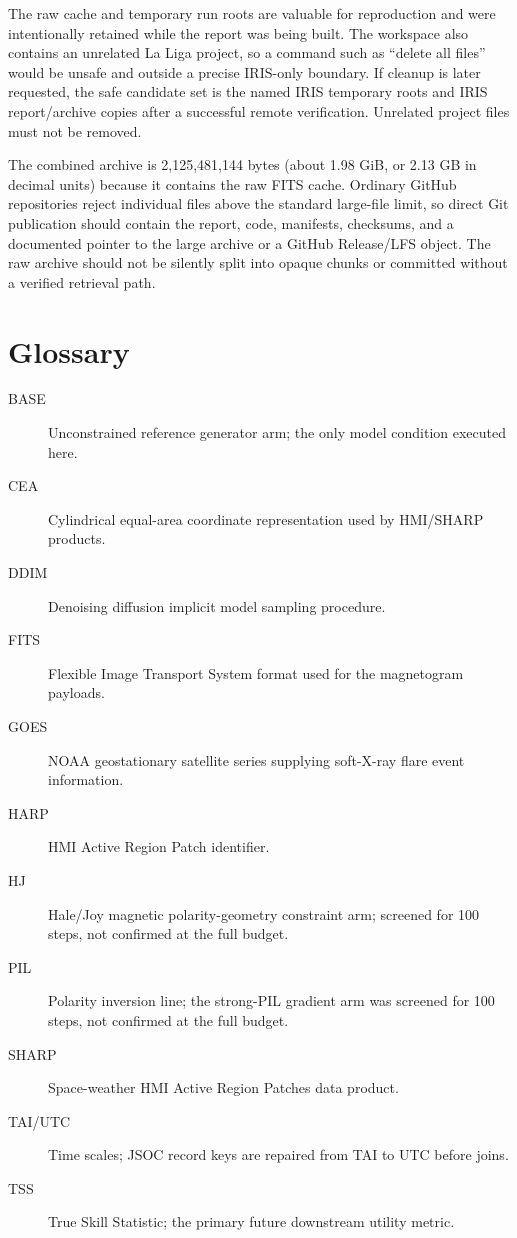 \documentclass[11pt,oneside]{report}
\begin{document}
The raw cache and temporary run roots are valuable for reproduction and were intentionally retained while the report was being built. The workspace also contains an unrelated La Liga project, so a command such as ``delete all files'' would be unsafe and outside a precise IRIS-only boundary. If cleanup is later requested, the safe candidate set is the named IRIS temporary roots and IRIS report/archive copies after a successful remote verification. Unrelated project files must not be removed.

The combined archive is 2,125,481,144 bytes (about 1.98 GiB, or 2.13 GB in decimal units) because it contains the raw FITS cache. Ordinary GitHub repositories reject individual files above the standard large-file limit, so direct Git publication should contain the report, code, manifests, checksums, and a documented pointer to the large archive or a GitHub Release/LFS object. The raw archive should not be silently split into opaque chunks or committed without a verified retrieval path.

\chapter{Glossary}

\begin{description}
\item[BASE] Unconstrained reference generator arm; the only model condition executed here.
\item[CEA] Cylindrical equal-area coordinate representation used by HMI/SHARP products.
\item[DDIM] Denoising diffusion implicit model sampling procedure.
\item[FITS] Flexible Image Transport System format used for the magnetogram payloads.
\item[GOES] NOAA geostationary satellite series supplying soft-X-ray flare event information.
\item[HARP] HMI Active Region Patch identifier.
\item[HJ] Hale/Joy magnetic polarity-geometry constraint arm; screened for 100 steps, not confirmed at the full budget.
\item[PIL] Polarity inversion line; the strong-PIL gradient arm was screened for 100 steps, not confirmed at the full budget.
\item[SHARP] Space-weather HMI Active Region Patches data product.
\item[TAI/UTC] Time scales; JSOC record keys are repaired from TAI to UTC before joins.
\item[TSS] True Skill Statistic; the primary future downstream utility metric.
\end{description}
\end{document}
